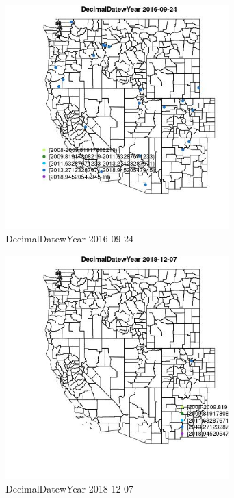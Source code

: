 \begin{figure} 
\centering  
\includegraphics[width=0.77\textwidth]{Code_Outputs/Report_ML_input_PM25_Step4_part_e_de_duplicated_aves_MapObsDecimalDatewYear2016-09-24.jpg} 
\caption{\label{fig:Report_ML_input_PM25_Step4_part_e_de_duplicated_avesMapObsDecimalDatewYear2016-09-24}DecimalDatewYear 2016-09-24} 
\end{figure} 
 

\begin{figure} 
\centering  
\includegraphics[width=0.77\textwidth]{Code_Outputs/Report_ML_input_PM25_Step4_part_e_de_duplicated_aves_MapObsDecimalDatewYear2018-12-07.jpg} 
\caption{\label{fig:Report_ML_input_PM25_Step4_part_e_de_duplicated_avesMapObsDecimalDatewYear2018-12-07}DecimalDatewYear 2018-12-07} 
\end{figure} 
 

